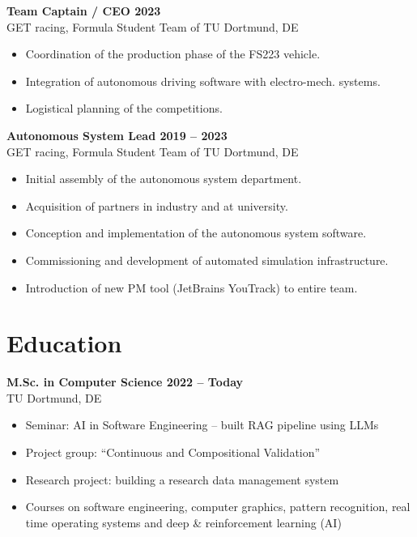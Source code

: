 \documentclass[a4paper,11pt]{article}
\newcommand{\subsectionskip}[0]{\vspace{0.125cm}}
\newcommand{\col}[2]{\textcolor[HTML]{#1}{#2}}
\begin{document}
\begin{minipage}[t]{0.65\textwidth}
    \subsectionskip

    \col{b38668}{\textbf{Team Captain / CEO \hfill 2023}} \\
    GET racing, Formula Student Team of TU Dortmund, DE
    \begin{itemize}
        \small
        \item Coordination of the production phase of the FS223 vehicle.
        \item Integration of autonomous driving software with electro-mech. systems.
        \item Logistical planning of the competitions.
    \end{itemize}

    \subsectionskip

    \textbf{\col{a68573}{Autonomous System Lead \hfill 2019 -- 2023}} \\
    GET racing, Formula Student Team of TU Dortmund, DE
    \begin{itemize}
        \small
        \item Initial assembly of the autonomous system department.
        \item Acquisition of partners in industry and at university.
        \item Conception and implementation of the autonomous system software.
        \item Commissioning and development of automated simulation infrastructure.
        \item Introduction of new PM tool (JetBrains YouTrack) to entire team.
    \end{itemize}

    \section*{\col{908587}{Education}}
    \col{91878a}{\textbf{M.Sc. in Computer Science \hfill 2022 -- Today}} \\
    TU Dortmund, DE
    \begin{itemize}
        \small
        \item Seminar: AI in Software Engineering -- built RAG pipeline using LLMs
        \item Project group: \enquote{Continuous and Compositional Validation}
        \item Research project: building a research data management system
        \item Courses on software engineering, computer graphics, pattern recognition, real time operating systems and deep \& reinforcement learning (AI)
    \end{itemize}


\end{minipage}
\end{document}
